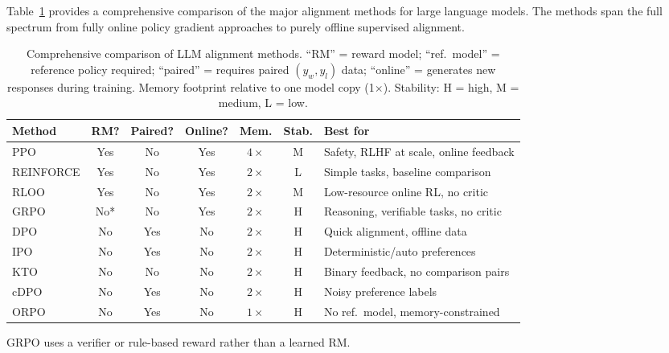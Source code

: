 Table~\ref{tab:alignment-comparison} provides a comprehensive comparison of the major alignment methods for large language models. The methods span the full spectrum from fully online policy gradient approaches to purely offline supervised alignment.

\begin{table}[ht]
\centering
\caption{Comprehensive comparison of LLM alignment methods. ``RM'' = reward model; ``ref.\ model'' = reference policy required; ``paired'' = requires paired $(y_w, y_l)$ data; ``online'' = generates new responses during training. Memory footprint relative to one model copy (1$\times$). Stability: H = high, M = medium, L = low.}
\label{tab:alignment-comparison}
\footnotesize
\begin{tabular}{@{}lcccccp{2.2cm}@{}}
\toprule
\textbf{Method} & \textbf{RM?} & \textbf{Paired?} & \textbf{Online?} & \textbf{Mem.} & \textbf{Stab.} & \textbf{Best for} \\
\midrule
PPO        & Yes  & No  & Yes & $4\times$ & M & Safety, RLHF at scale, online feedback \\
REINFORCE  & Yes  & No  & Yes & $2\times$ & L & Simple tasks, baseline comparison \\
RLOO       & Yes  & No  & Yes & $2\times$ & M & Low-resource online RL, no critic \\
GRPO       & No*  & No  & Yes & $2\times$ & H & Reasoning, verifiable tasks, no critic \\
DPO        & No   & Yes & No  & $2\times$ & H & Quick alignment, offline data \\
IPO        & No   & Yes & No  & $2\times$ & H & Deterministic/auto preferences \\
KTO        & No   & No  & No  & $2\times$ & H & Binary feedback, no comparison pairs \\
cDPO       & No   & Yes & No  & $2\times$ & H & Noisy preference labels \\
ORPO       & No   & Yes & No  & $1\times$ & H & No ref.\ model, memory-constrained \\
\bottomrule
\end{tabular}

\smallskip
{\footnotesize *GRPO uses a verifier or rule-based reward rather than a learned RM.}
\end{table}

